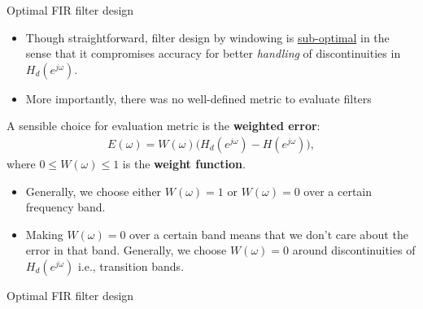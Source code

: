 \documentclass[10pt, aspectratio=169]{beamer}
\begin{document}
\begin{frame}{Optimal FIR filter design}
\begin{itemize}
	\item Though straightforward, filter design by windowing is \underline{sub-optimal} in the sense that it compromises accuracy for better \textit{handling} of discontinuities in $H_d(e^{j\omega})$.
	\item More importantly, there was no well-defined metric to evaluate filters
\end{itemize}
	\vspace{0.25cm}
	
	A sensible choice for evaluation metric is the \textbf{weighted error}:
	\begin{align*}
		E(\omega) = W(\omega)\Big(H_d(e^{j\omega}) - H(e^{j\omega})\Big), \tag{weighted error}
	\end{align*}
	where $0 \leq W(\omega) \leq 1$ is the \textbf{weight function}. 
	\vspace{0.25cm}
	
	\begin{itemize}
		\item Generally, we choose either $W(\omega) = 1$ or $W(\omega) = 0$ over a certain frequency band.
		\item Making $W(\omega) = 0$ over a certain band means that we don't care about the error in that band. Generally, we choose $W(\omega) = 0$ around discontinuities of $H_d(e^{j\omega})$ i.e., transition bands.
	\end{itemize}	
\end{frame}

\begin{frame}{Optimal FIR filter design}		
	\begin{center}
		\def\CARE{1}
		\resizebox{0.7\linewidth}{!}{}
	\end{center}
\end{frame}
\end{document}
